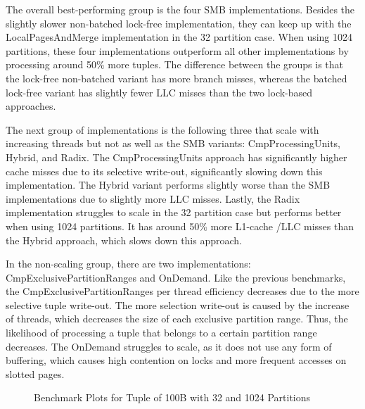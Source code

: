 The overall best-performing group is the four \ac{SMB} implementations.
Besides the slightly slower non-batched lock-free implementation, they can keep up with the LocalPagesAndMerge implementation in the 32 partition case.
When using 1024 partitions, these four implementations outperform all other implementations by processing around 50\% more tuples.
The difference between the groups is that the lock-free non-batched variant has more branch misses, whereas the batched lock-free variant has slightly fewer \ac{LLC} misses than the two lock-based approaches.

The next group of implementations is the following three that scale with increasing threads but not as well as the \ac{SMB} variants: CmpProcessingUnits, Hybrid, and Radix.
The CmpProcessingUnits approach has significantly higher cache misses due to its selective write-out, significantly slowing down this implementation.
The Hybrid variant performs slightly worse than the \ac{SMB} implementations due to slightly more \ac{LLC} misses.
Lastly, the Radix implementation struggles to scale in the 32 partition case but performs better when using 1024 partitions.
It has around 50\% more L1-cache /\ac{LLC} misses than the Hybrid approach, which slows down this approach.

In the non-scaling group, there are two implementations: CmpExclusivePartitionRanges and OnDemand.
Like the previous benchmarks, the CmpExclusivePartitionRanges per thread efficiency decreases due to the more selective tuple write-out.
The more selection write-out is caused by the increase of threads, which decreases the size of each exclusive partition range.
Thus, the likelihood of processing a tuple that belongs to a certain partition range decreases.
The OnDemand struggles to scale, as it does not use any form of buffering, which causes high contention on locks and more frequent accesses on slotted pages.

\begin{figure}[h]
  \centering
  \begin{subfigure}{.49\textwidth}
    \centering
    \resizebox{\linewidth}{!}{}
  \end{subfigure}
  \begin{subfigure}{.49\textwidth}
    \centering
    \resizebox{\linewidth}{!}{}
  \end{subfigure}
  \begin{subfigure}{\textwidth}
    \centering
    \resizebox{\linewidth}{!}{}
  \end{subfigure}
  \caption[Shuffle Benchmark Plots for Tuple of 100B with 32 and 1024 Partitions]{Benchmark Plots for Tuple of 100B with 32 and 1024 Partitions}
  \label{plot-shuffle-100B-32-1024}
\end{figure}

